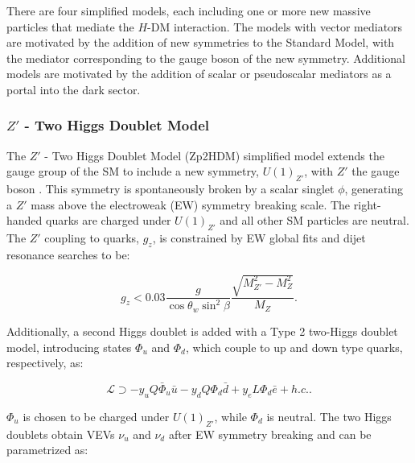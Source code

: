 \indent There are four simplified models, each including one or more new massive particles that mediate the $H$-DM interaction. The models with vector mediators are motivated by the addition of new symmetries to the Standard Model, with the mediator corresponding to the gauge boson of the new symmetry. Additional models are motivated by the addition of scalar or pseudoscalar mediators as a portal into the dark sector.

\subsubsection{$Z'$ - Two Higgs Doublet Model}

The $Z'$ - Two Higgs Doublet Model (Zp2HDM) simplified model extends the gauge group of the SM to include a new symmetry, $U(1)_{Z'}$, with $Z'$ the gauge boson \cite{Berlin:2014cfa}. This symmetry is spontaneously broken by a scalar singlet $\phi$, generating a $Z'$ mass above the electroweak (EW) symmetry breaking scale. The right-handed quarks are charged under $U(1)_{Z'}$ and all other SM particles are neutral. The $Z'$ coupling to quarks, $g_z$, is constrained by EW global fits \cite{PhysRevD.86.010001} and dijet resonance searches \cite{Aaltonen:2008dn, Chatrchyan:2013qha} to be:

\begin{equation}
g_z < 0.03 \frac{g}{\cos\theta_w\sin^2\beta}\frac{\sqrt{M_{Z'}^2-M_Z^2}}{M_Z}.
\end{equation}

Additionally, a second Higgs doublet is added with a Type 2 two-Higgs doublet model, introducing states $\Phi_u$ and $\Phi_d$, which couple to up and down type quarks, respectively, as:

\begin{equation}
\mathcal{L} \supset -y_u Q \bar{\Phi}_u \bar{u} - y_d Q \Phi_d \bar{d} + y_e L \Phi_d \bar{e} + h.c..
\end{equation}

$\Phi_u$ is chosen to be charged under $U(1)_{Z'}$, while $\Phi_d$ is neutral. The two Higgs doublets obtain VEVs $\nu_u$ and $\nu_d$ after EW symmetry breaking and can be parametrized as:

